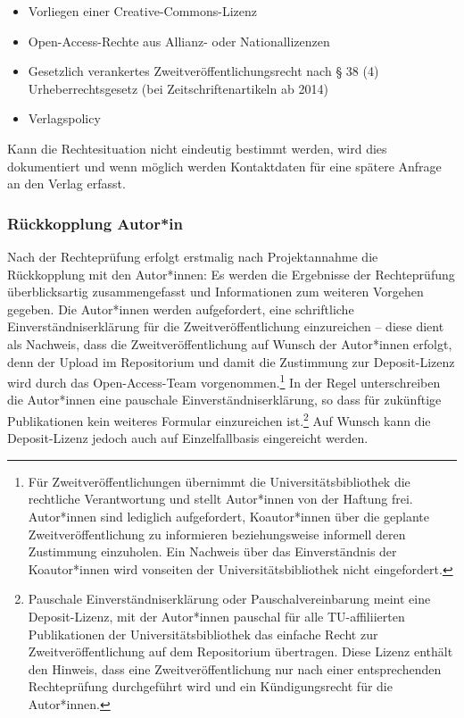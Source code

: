 \documentclass[a4paper,
fontsize=11pt,
oneside,
numbers=noperiodatend,
parskip=half-,
bibliography=totoc,
final
]{scrartcl}
\begin{document}
\begin{itemize}
\item
  Vorliegen einer Creative-Commons-Lizenz
\item
  Open-Access-Rechte aus Allianz- oder Nationallizenzen
\item
  Gesetzlich verankertes Zweitveröffentlichungsrecht nach § 38 (4)
  Urheberrechtsgesetz (bei Zeitschriftenartikeln ab 2014)
\item
  Verlagspolicy
\end{itemize}

Kann die Rechtesituation nicht eindeutig bestimmt werden, wird dies
dokumentiert und wenn möglich werden Kontaktdaten für eine spätere
Anfrage an den Verlag erfasst.

\hypertarget{ruxfcckkopplung-autorin}{%
\subsubsection{Rückkopplung Autor*in}\label{ruxfcckkopplung-autorin}}

Nach der Rechteprüfung erfolgt erstmalig nach Projektannahme die
Rückkopplung mit den Autor*innen: Es werden die Ergebnisse der
Rechteprüfung überblicksartig zusammengefasst und Informationen zum
weiteren Vorgehen gegeben. Die Autor*innen werden aufgefordert, eine
schriftliche Einverständniserklärung für die Zweitveröffentlichung
einzureichen -- diese dient als Nachweis, dass die Zweitveröffentlichung
auf Wunsch der Autor*innen erfolgt, denn der Upload im Repositorium und
damit die Zustimmung zur Deposit-Lizenz wird durch das Open-Access-Team
vorgenommen.\footnote{Für Zweitveröffentlichungen übernimmt die
  Universitätsbibliothek die rechtliche Verantwortung und stellt
  Autor*innen von der Haftung frei. Autor*innen sind lediglich
  aufgefordert, Koautor*innen über die geplante Zweitveröffentlichung zu
  informieren beziehungsweise informell deren Zustimmung einzuholen. Ein
  Nachweis über das Einverständnis der Koautor*innen wird vonseiten der
  Universitätsbibliothek nicht eingefordert.} In der Regel
unterschreiben die Autor*innen eine pauschale Einverständniserklärung,
so dass für zukünftige Publikationen kein weiteres Formular einzureichen
ist.\footnote{Pauschale Einverständniserklärung oder
  Pauschalvereinbarung meint eine Deposit-Lizenz, mit der Autor*innen
  pauschal für alle TU-affiliierten Publikationen der
  Universitätsbibliothek das einfache Recht zur Zweitveröffentlichung
  auf dem Repositorium übertragen. Diese Lizenz enthält den Hinweis,
  dass eine Zweitveröffentlichung nur nach einer entsprechenden
  Rechteprüfung durchgeführt wird und ein Kündigungsrecht für die
  Autor*innen.} Auf Wunsch kann die Deposit-Lizenz jedoch auch auf
Einzelfallbasis eingereicht werden.
\end{document}
